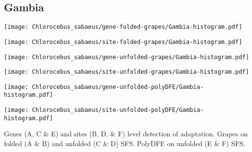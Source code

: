 \documentclass{article}
\begin{document}
\subsection{Gambia}
\centering
\begin{minipage}{0.49\linewidth}
    \texttt{[image: Chlorocebus\_sabaeus/gene-folded-grapes/Gambia-histogram.pdf]}
\end{minipage}%
\hfill
\begin{minipage}{0.49\linewidth}
    \texttt{[image: Chlorocebus\_sabaeus/site-folded-grapes/Gambia-histogram.pdf]}
\end{minipage}
\hfill
\begin{minipage}{0.49\linewidth}
    \texttt{[image: Chlorocebus\_sabaeus/gene-unfolded-grapes/Gambia-histogram.pdf]}
\end{minipage}%
\hfill
\begin{minipage}{0.49\linewidth}
    \texttt{[image: Chlorocebus\_sabaeus/site-unfolded-grapes/Gambia-histogram.pdf]}
\end{minipage}
\hfill
\begin{minipage}{0.49\linewidth}
    \texttt{[image: Chlorocebus\_sabaeus/gene-unfolded-polyDFE/Gambia-histogram.pdf]}
\end{minipage}%
\hfill
\begin{minipage}{0.49\linewidth}
    \texttt{[image: Chlorocebus\_sabaeus/site-unfolded-polyDFE/Gambia-histogram.pdf]}
\end{minipage}
\hfill
\flushleft
Genes (A, C \& E) and sites (B, D, \& F) level detection of adaptation.
Grapes on folded (A \& B) and unfolded (C \& D) SFS.
PolyDFE on unfolded (E \& F) SFS.

\pagebreak
\end{document}
